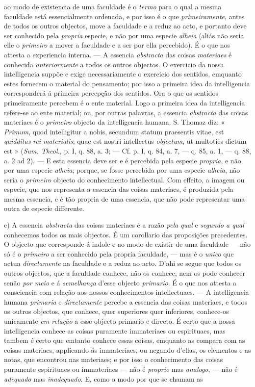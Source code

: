 ao modo de existencia de uma faculdade é o \emph{termo} para o qual a mesma faculdade está essencialmente ordenada, e por isso é o que \emph{primeiramente}, antes de todos os outros objectos, move a faculdade e a reduz ao acto, e portanto deve ser conhecido pela \emph{propria} especie, e não por uma especie \emph{alheia} (aliás não seria elle o \emph{primeiro} a mover a faculdade e a ser por ella percebido). É o que nos attesta a experiencia interna. --- A essencia \emph{abstracta} das coisas \emph{materiaes} é conhecida \emph{anteriormente} a todos os outros objectos. O exercicio da nossa intelligencia suppõe e exige necessariamente o exercicio dos sentidos, emquanto estes fornecem o material do pensamento; por isso a primeira idea da intelligencia corresponderá á primeira percepção dos sentidos. Ora o que os sentidos primeiramente percebem é o ente material. Logo a primeira idea da intelligencia refere-se ao ente material; ou, por outras palavras, a essencia \emph{abstracta} das coisas materiaes é o \emph{primeiro} objecto da intelligencia humana. S. Thomaz diz: « \emph{Primum}, quod intelligitur a nobis, secundum statum praesentis vitae, est \emph{quidditas}\emph{ rei materialis}; quae est nostri intellectus \emph{objectum}, ut multoties dictum est » (\emph{Sum. Theol.}, p. I, q. 88, a. 3; --- Cf. p. I, q. 84, a. 7, --- q. 85, a. 1, --- q. 88, a. 2 ad 2). --- E esta essencia deve ser e é percebida pela especie \emph{propria}, e não por uma especie \emph{alheia}; porque, se fosse percebida por uma especie \emph{alheia}, não seria o \emph{primeiro} objecto do conhecimento intellectual. Com effeito, a imagem ou especie, que nos representa a essencia das coisas materiaes, é produzida pela mesma essencia, e é tão propria de uma essencia, que não pode representar uma outra de especie differente.\par c) A essencia \emph{abstracta} das coisas materiaes é a razão \emph{pela qual} e \emph{segundo a qual} conhecemos todos os mais objectos. É um corollario das proposições precedentes. O objecto que corresponde á indole e ao modo de existir de uma faculdade --- não só é o \emph{primeiro} a ser conhecido pela propria faculdade, --- mas é o \emph{unico} que actua \emph{directamente} na faculdade e a reduz ao acto. D'ahi se segue que todos os outros objectos, que a faculdade conhece, não os conhece, nem os pode conhecer senão \emph{por meio} e á \emph{semelhança} d'esse objecto \emph{primario}. É o que nos attesta a consciencia com relação aos nossos conhecimentos intellectuaes. --- A intelligencia humana \emph{primaria} e \emph{directamente} percebe a essencia das coisas materiaes, e todos os outros objectos, que conhece, quer superiores quer inferiores, conhece-os unicamente \emph{em relação} a esse objecto primario e directo. É certo que a nossa intelligencia conhece as coisas puramente immateriaes ou espirituaes, mas tambem é certo que emtanto conhece essas coisas, emquanto as compara com as coisas materiaes, applicando ás immateriaes, ou negando d'ellas, os elementos e as notas, que encontrou nas materiaes; e por isso o conhecimento das coisas puramente espirituaes ou immateriaes --- não é \emph{proprio} mas \emph{analogo}, --- não é \emph{adequado} mas \emph{inadequado}. E, como o modo por que se chamam as 